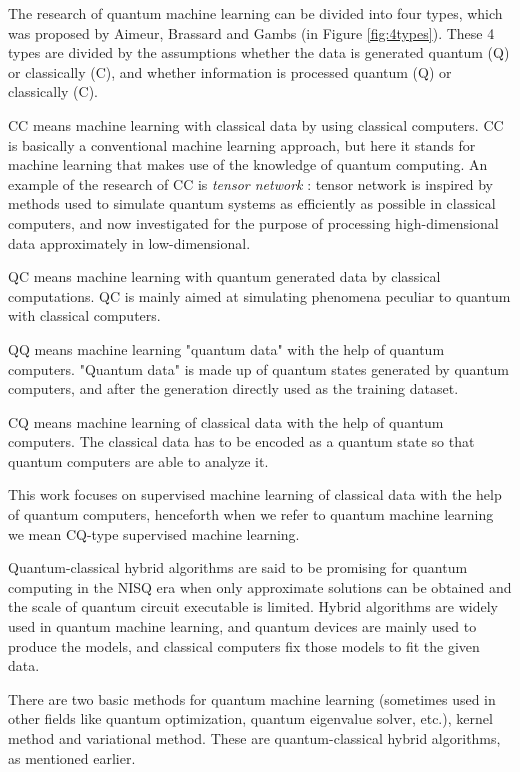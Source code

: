 \par The research of quantum machine learning can be divided into four types, which was proposed by Aimeur, Brassard and Gambs \cite{4types} (in Figure \ref{fig:4types}). These 4 types are divided by the assumptions whether the data is generated quantum (Q) or classically (C), and whether information is processed quantum (Q) or classically (C). 

\par CC means machine learning with classical data by using classical computers. CC is basically a conventional machine learning approach, but here it stands for machine learning that makes use of the knowledge of quantum computing. An example of the research of CC is \textit{tensor network} \cite{tensor1, tensor2}: tensor network is inspired by methods used to simulate quantum systems as efficiently as possible in classical computers, and now investigated for the purpose of processing high-dimensional data approximately in low-dimensional. 

\par QC means machine learning with quantum generated data by classical computations. QC is mainly aimed at simulating phenomena peculiar to quantum with classical computers. \cite{entannn,tomogra}

\par QQ means machine learning "quantum data" with the help of quantum computers. "Quantum data" is made up of quantum states generated by quantum computers, and after the generation directly used as the training dataset.

\par CQ means machine learning of classical data with the help of quantum computers. The classical data has to be encoded as a quantum state so that quantum computers are able to analyze it. 

\par This work focuses on supervised machine learning of classical data with the help of quantum computers, henceforth when we refer to quantum machine learning we mean CQ-type supervised machine learning.

\par Quantum-classical hybrid algorithms are said to be promising for quantum computing in the NISQ era when only approximate solutions can be obtained and the scale of quantum circuit executable is limited. Hybrid algorithms are widely used in quantum machine learning, and quantum devices are mainly used to produce the models, and classical computers fix those models to fit the given data.

\par There are two basic methods for quantum machine learning (sometimes used in other fields like quantum optimization, quantum eigenvalue solver, etc.), kernel method and variational method. These are quantum-classical hybrid algorithms, as mentioned earlier.